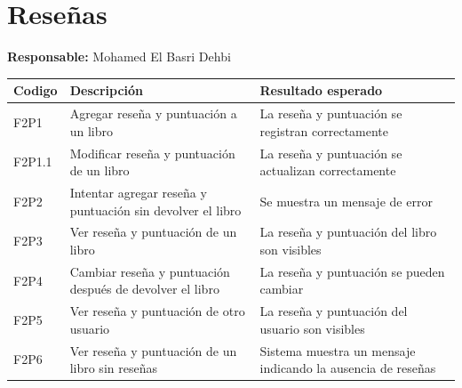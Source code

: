 ﻿\documentclass{report}
\begin{document}
        \section{Reseñas}
            \begin{center}
                \textbf{Responsable:} Mohamed El Basri Dehbi\\
                \begin{longtable}{|m{2cm}|m{4cm}|m{4cm}|}
                    \hline
                    Codigo & Descripción & Resultado esperado \\
                    \hline
                    \endhead
                    \hline
                    F2P1 & Agregar reseña y puntuación a un libro & La reseña y puntuación se registran correctamente \\
                    \hline
                    F2P1.1 & Modificar reseña y puntuación de un libro & La reseña y puntuación se actualizan correctamente \\
                    \hline
                    F2P2 & Intentar agregar reseña y puntuación sin devolver el libro & Se muestra un mensaje de error \\
                    \hline
                    F2P3 & Ver reseña y puntuación de un libro & La reseña y puntuación del libro son visibles \\
                    \hline
                    F2P4 & Cambiar reseña y puntuación después de devolver el libro & La reseña y puntuación se pueden cambiar \\
                    \hline
                    F2P5 & Ver reseña y puntuación de otro usuario & La reseña y puntuación del usuario son visibles \\
                    \hline
                    F2P6 & Ver reseña y puntuación de un libro sin reseñas & Sistema muestra un mensaje indicando la ausencia de reseñas \\
                    \hline
                \end{longtable}
            \end{center}
            \clearpage
\end{document}
